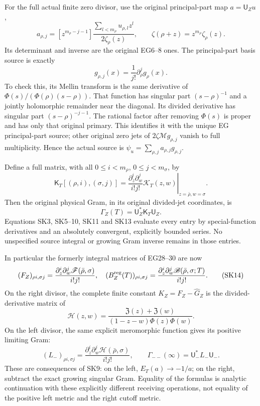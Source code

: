 For the full actual finite zero divisor, use the original principal-part map \(a=\mathsf U_Zu\), \[
a_{\rho,j}=[z^{m_\rho-j-1}]
\frac{\sum_{l<m_\rho}u_{\rho,l}z^l}{2\zeta_\rho(z)},
\qquad \zeta(\rho+z)=z^{m_\rho}\zeta_\rho(z).
\tag{SK11}
\] Its determinant and inverse are the original EG6--8 ones. The principal-part basis source is exactly \[
g_{\rho,j}(x)=\frac1{j!}\partial_\rho^j g_\rho(x).
\tag{SK12}
\] To check this, its Mellin transform is the same derivative of \(\Phi(s)/(\Phi(\rho)(s-\rho))\). That function has singular part \((s-\rho)^{-1}\) and a jointly holomorphic remainder near the diagonal. Its divided derivative has singular part \((s-\rho)^{-j-1}\). The rational factor after removing \(\Phi(s)\) is proper and has only that original primary. This identifies it with the unique EG principal-part source; other original zero jets of \(2\zeta\mathcal M g_{\rho,j}\) vanish to full multiplicity. Hence the actual source is \(\psi_u=\sum_{\rho,j}a_{\rho,j}g_{\rho,j}\).

Define a full matrix, with all \(0\le i<m_\rho\), \(0\le j<m_\sigma\), by \[
\mathsf K_T[(\rho,i),(\sigma,j)]
=\left.\frac{\partial_z^i\partial_w^j}{i!j!}
\mathscr K_T(z,w)\right|_{z=\bar\rho,w=\sigma}.
\] Then the original physical Gram, in its original divided-jet coordinates, is \[
\boxed{\Gamma_Z(T)=\mathsf U_Z^*\mathsf K_T\mathsf U_Z.}
\tag{SK13}
\] Equations SK3, SK5--10, SK11 and SK13 evaluate every entry by special-function derivatives and an absolutely convergent, explicitly bounded series. No unspecified source integral or growing Gram inverse remains in those entries.

In particular the formerly integral matrices of EG28--30 are now \[
(F_Z)_{\rho i,\sigma j}
=\frac{\partial_z^i\partial_w^j\mathscr F(\bar\rho,\sigma)}{i!j!},
\quad (B_Z^{\rm reg}(T))_{\rho i,\sigma j}
=\frac{\partial_z^i\partial_w^j\mathscr B(\bar\rho,\sigma;T)}{i!j!}.
\tag{SK14}
\] On the right divisor, the complete finite constant \(K_Z=F_Z-\widehat G_Z\) is the divided-derivative matrix of \[
\boxed{\displaystyle
\mathscr H(z,w)=
\frac{\mathfrak Z(z)+\mathfrak Z(w)}{(1-z-w)\Phi(z)\Phi(w)}.}
\tag{SK15}
\] On the left divisor, the same explicit meromorphic function gives its positive limiting Gram: \[
\boxed{\displaystyle
(L_-)_{\rho i,\sigma j}
=\frac{\partial_z^i\partial_w^j\mathscr H(\bar\rho,\sigma)}{i!j!},
\qquad \Gamma_{--}(\infty)=\mathsf U_-^*L_-\mathsf U_-.}
\tag{SK16}
\] These are consequences of SK9: on the left, \(E_T(a)\to-1/a\); on the right, subtract the exact growing singular Gram. Equality of the formulas is analytic continuation with these explicitly different receiving operations, not equality of the positive left metric and the right cutoff metric.

